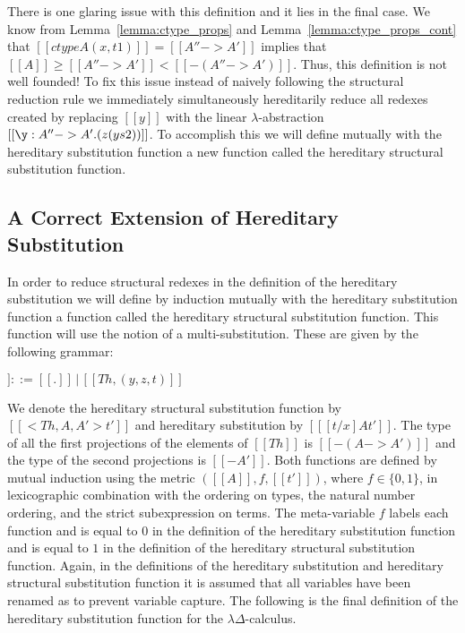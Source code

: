 There is one glaring issue with this definition and it lies in the final case.  
We know from Lemma~\ref{lemma:ctype_props} and Lemma~\ref{lemma:ctype_props_cont} 
that $[[ctype A (x,t1)]] = [[A'' -> A']]$ 
implies that $[[A]] \geq [[A'' -> A']] < [[{-(A'' ->  A')}]]$. Thus, this 
definition is not well founded!  To fix this issue instead of naively following 
the structural reduction rule we immediately simultaneously hereditarily reduce 
all redexes created by replacing $[[y]]$ with the linear $\lambda$-abstraction
$[[\y:A'' ->A'.(z (y s2))]]$.  To accomplish this we will define mutually with
the hereditary substitution function a new function called the hereditary
structural substitution function.

\subsection{A Correct Extension of Hereditary Substitution}
\label{subsec:the_final_extension}
In order to reduce structural redexes in the definition of the
hereditary substitution we will define by induction mutually with
the hereditary substitution function  a function called the
hereditary structural substitution function.  This function will
use the notion of a multi-substitution.  These are
given by the following grammar:
\begin{center}
  \begin{math}
    [[Th]] ::= [[.]]\,|\,[[Th,(y,z,t)]]
  \end{math}
\end{center}
We denote the hereditary structural substitution function by $[[<Th ,
A, A'>t']]$ and hereditary substitution by $[[ [t/x] A t']]$.  The
type of all the first projections of the elements of $[[Th]]$ is
$[[{-(A->A')}]]$ and the type of the second projections is $[[{-A'}]]$.
Both functions are defined by mutual induction using the metric
$([[A]],f,[[t']])$, where $f \in \{0,1\}$, in lexicographic
combination with the ordering on types, the natural number ordering,
and the strict subexpression on terms.  The meta-variable $f$ labels
each function and is equal to $0$ in the definition of the hereditary
substitution function and is equal to $1$ in the definition of the
hereditary structural substitution function.  Again, in the definitions of
the hereditary substitution and hereditary structural substitution
function it is assumed that all variables have been renamed as to
prevent variable capture.  The following is the final definition of the
hereditary substitution function for the $\lambda\Delta$-calculus.

